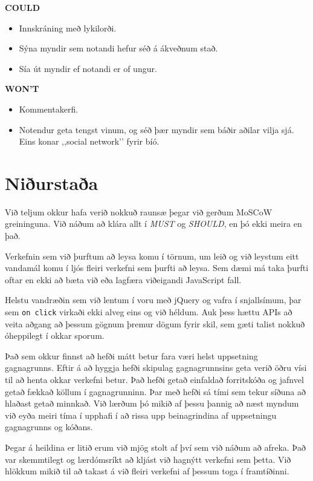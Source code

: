 \documentclass[a4paper,oneside]{article}
\begin{document}
\noindent\textbf{COULD}
\begin{itemize}
    \item Innskráning með lykilorði.
    \item Sýna myndir sem notandi hefur séð á ákveðnum stað.
    \item Sía út myndir ef notandi er of ungur.
\end{itemize}

\noindent\textbf{WON'T}
\begin{itemize}
    \item Kommentakerfi.
    \item Notendur geta tengst vinum, og séð þær myndir sem báðir aðilar vilja sjá.
        Eins konar ,,social network’’ fyrir bíó.
\end{itemize}

\section{Niðurstaða}
Við teljum okkur hafa verið nokkuð raunsæ þegar við gerðum MoSCoW greininguna. 
Við náðum að klára allt í \emph{MUST} og \emph{SHOULD}, en þó ekki meira en það. 

Verkefnin sem við þurftum að leysa komu í törnum, um leið og við leystum eitt 
vandamál komu í ljós fleiri verkefni sem þurfti að leysa. Sem dæmi má taka þurfti
oftar en ekki að bæta við eða lagfæra viðeigandi JavaScript fall.

Helstu vandræðin sem við lentum í voru með jQuery og vafra í snjallsímum, þar sem
\texttt{on click} virkaði ekki alveg eins og við héldum. Auk þess hættu APIs að 
veita aðgang að þessum gögnum þremur dögum fyrir skil, sem gæti talist nokkuð óheppilegt
í okkar sporum. 

Það sem okkur finnst að hefði mátt betur fara væri helst uppsetning gagnagrunns. Eftir á
að hyggja hefði skipulag gagnagrunnsins geta verið öðru vísi til að henta okkar verkefni 
betur. Það hefði getað einfaldað forritskóða og jafnvel getað fækkað köllum í gagnagrunninn.
Þar með hefði sá tími sem tekur síðuna að hlaðast getað minnkað. Við lærðum þó mikið af þessu 
þannig að næst myndum við eyða meiri tíma í upphafi í að rissa upp beinagrindina af uppsetningu 
gagnagrunns og kóðans.

Þegar á heildina er litið erum við mjög stolt af því sem við náðum að afreka. Það var skemmtilegt 
og lærdómsríkt að kljást við hagnýtt verkefni sem þetta. Við hlökkum mikið til að takast á við fleiri
verkefni af þessum toga í framtíðinni.
\end{document}
